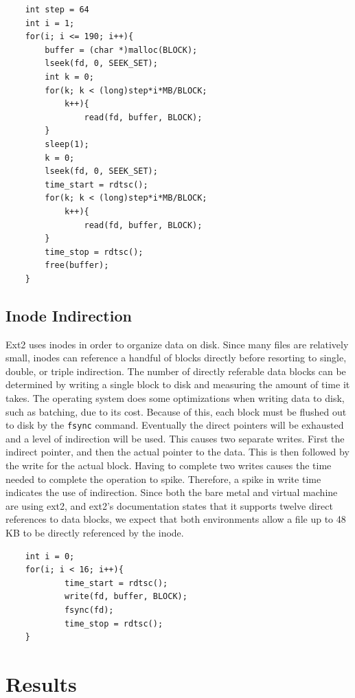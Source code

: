 \documentclass[letterpaper,twocolumn,10pt]{article}
\begin{document}
\begin{verbatim}
    int step = 64
    int i = 1;
    for(i; i <= 190; i++){
        buffer = (char *)malloc(BLOCK);
        lseek(fd, 0, SEEK_SET);
        int k = 0;
        for(k; k < (long)step*i*MB/BLOCK; 
            k++){
                read(fd, buffer, BLOCK);
        }
        sleep(1);
        k = 0;
        lseek(fd, 0, SEEK_SET);
        time_start = rdtsc();
        for(k; k < (long)step*i*MB/BLOCK; 
            k++){
                read(fd, buffer, BLOCK);
        }
        time_stop = rdtsc();
        free(buffer);
    }
\end{verbatim}

\subsection{Inode Indirection}
Ext2 uses inodes in order to organize data on disk. 
Since many files are relatively small, inodes can reference a handful of blocks directly before resorting to single, double, or triple indirection.
The number of directly referable data blocks can be determined by writing a single block to disk and measuring the amount of time it takes. 
The operating system does some optimizations when writing data to disk, such as batching, due to its cost. 
Because of this, each block must be flushed out to disk by the \texttt{fsync} command.
Eventually the direct pointers will be exhausted and a level of indirection will be used. 
This causes two separate writes. 
First the indirect pointer, and then the actual pointer to the data. 
This is then followed by the write for the actual block. 
Having to complete two writes causes the time needed to complete the operation to spike. 
Therefore, a spike in write time indicates the use of indirection.
Since both the bare metal and virtual machine are using ext2, and ext2's documentation states that it supports twelve direct references to data blocks, we expect that both environments allow a file up to 48 KB to be directly referenced by the inode.

\begin{verbatim}
    int i = 0;
    for(i; i < 16; i++){
            time_start = rdtsc();
            write(fd, buffer, BLOCK);
            fsync(fd);
            time_stop = rdtsc();
    }
\end{verbatim}

\section{Results}
\end{document}
